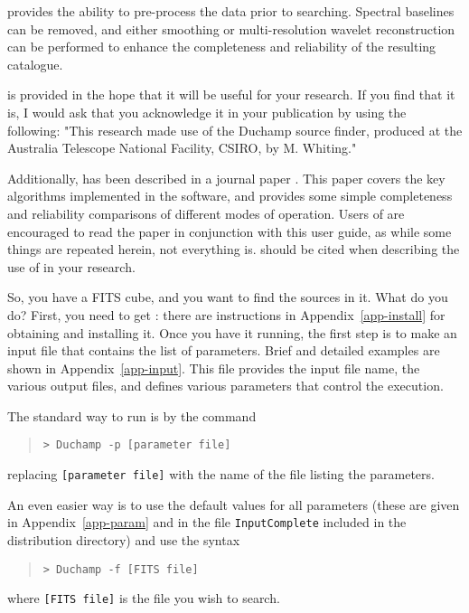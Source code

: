 \duchamp provides the ability to pre-process the data prior to
searching. Spectral baselines can be removed, and either smoothing or
multi-resolution wavelet reconstruction can be performed to enhance
the completeness and reliability of the resulting catalogue.


\duchamp is provided in the hope that it will be useful for your
research. If you find that it is, I would ask that you acknowledge it
in your publication by using the following:
"This research made use of the Duchamp source finder, produced at
the Australia Telescope National Facility, CSIRO, by M. Whiting."

Additionally, \duchamp has been described in a journal paper
\citep{whiting12}. This paper covers the key algorithms implemented in
the software, and provides some simple completeness and reliability
comparisons of different modes of operation. Users of \duchamp are
encouraged to read the paper in conjunction with this user guide, as
while some things are repeated herein, not everything
is. \citet{whiting12} should be cited when describing the use of
\duchamp in your research.




So, you have a FITS cube, and you want to find the sources in it. What
do you do? First, you need to get \duchamp: there are instructions in
Appendix~\ref{app-install} for obtaining and installing it. Once you
have it running, the first step is to make an input file that contains
the list of parameters. Brief and detailed examples are shown in
Appendix~\ref{app-input}. This file provides the input file name, the
various output files, and defines various parameters that control the
execution.

The standard way to run \duchamp is by the command
\begin{quote}
{\footnotesize
\texttt{> Duchamp -p [parameter file]}
}
\end{quote}
replacing \texttt{[parameter file]} with the name of the file listing
the parameters. 

An even easier way is to use the default values for all parameters
(these are given in Appendix~\ref{app-param} and in the file
\texttt{InputComplete} included in the distribution directory) and use
the syntax
\begin{quote}
{\footnotesize
\texttt{> Duchamp -f [FITS file]}
}
\end{quote}
where \texttt{[FITS file]} is the file you wish to search. 

